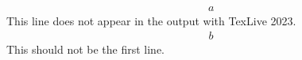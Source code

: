 \documentclass{article}
\begin{document}
\begin{align*}
    &a
\end{align*}
This line does not appear in the output with TexLive 2023.
\begin{align*}
 & b
\end{align*}
This should not be the first line.
\end{document}
